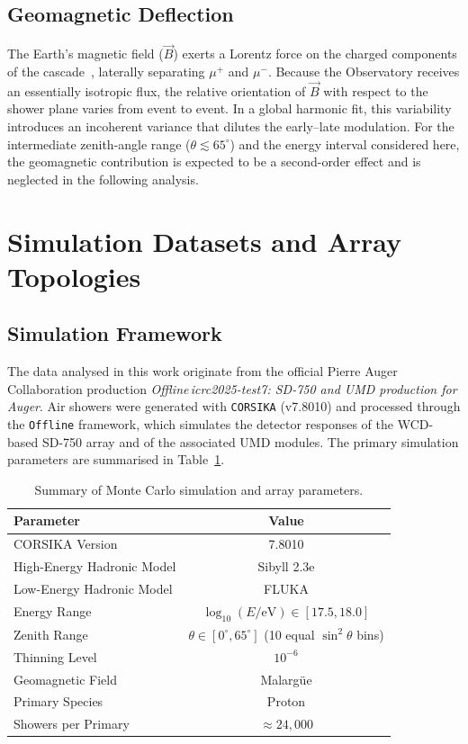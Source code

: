 \documentclass[11pt,a4paper]{article}
\begin{document}
\subsection{Geomagnetic Deflection}
\label{subsec:geomagnetic}

The Earth's magnetic field ($\vec{B}$) exerts a Lorentz force on the charged components of the cascade~\cite{Scornavacche2026,collaboration_2014}, laterally separating $\mu^{+}$ and $\mu^{-}$. Because the Observatory receives an essentially isotropic flux, the relative orientation of $\vec{B}$ with respect to the shower plane varies from event to event. In a global harmonic fit, this variability introduces an incoherent variance that dilutes the early--late modulation. For the intermediate zenith-angle range ($\theta \lesssim 65^{\circ}$) and the energy interval considered here, the geomagnetic contribution is expected to be a second-order effect and is neglected in the following analysis.

\section{Simulation Datasets and Array Topologies}
\label{sec:methodology}

\subsection{Simulation Framework}
\label{subsec:framework}

The data analysed in this work originate from the official Pierre Auger Collaboration production \textit{Offline\,icrc2025-test7: SD-750 and UMD production for Auger}. Air showers were generated with \texttt{CORSIKA} (v7.8010) \cite{heck1998} and processed through the \texttt{Offline} framework, which simulates the detector responses of the WCD-based SD-750 array and of the associated UMD modules. The primary simulation parameters are summarised in Table~\ref{tab:mc_params}.

\begin{table}[h]
\centering
\caption{Summary of Monte Carlo simulation and array parameters.}
\label{tab:mc_params}
\begin{tabularx}{0.8\textwidth}{X c}
\toprule
\textbf{Parameter} & \textbf{Value} \\
\midrule
CORSIKA Version & 7.8010 \\
High-Energy Hadronic Model & Sibyll 2.3e \cite{riehn2020} \\
Low-Energy Hadronic Model & FLUKA \\
Energy Range & $\log_{10}(E/\text{eV}) \in [17.5, 18.0]$ \\
Zenith Range & $\theta \in [0^\circ, 65^\circ]$ (10 equal $\sin^2\theta$ bins) \\
Thinning Level & $10^{-6}$ \\
Geomagnetic Field & Malarg\"ue  \\
Primary Species & Proton \\
Showers per Primary & $\approx 24,000$ \\
\bottomrule
\end{tabularx}
\end{table}
\end{document}
